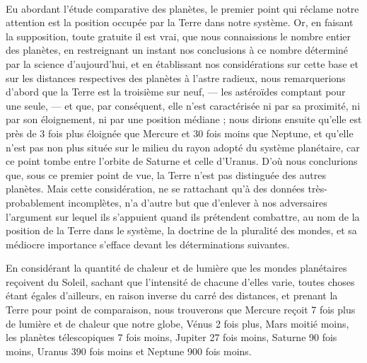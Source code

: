 \documentclass[a4paper, 11pt, oneside, landscape]{article}
\begin{document}
\paragraph{}
Eu abordant l'étude comparative des planètes, le premier point qui réclame notre attention est la position occupée par la Terre dans notre système. Or, en faisant la supposition, toute gratuite il est vrai, que nous connaissions le nombre entier des planètes, en restreignant un instant nos conclusions à ce nombre déterminé par la science d'aujourd'hui, et en établissant nos considérations sur cette base et sur les distances respectives des planètes à l'astre radieux, nous remarquerions d'abord que la Terre est la troisième sur neuf, --- les astéroïdes comptant pour une seule, --- et que, par conséquent, elle n'est caractérisée ni par sa proximité, ni par son éloignement, ni par une position médiane ; nous dirions ensuite qu'elle est près de 3 fois plus éloignée que Mercure et 30 fois moins que Neptune, et qu'elle n'est pas non plus située sur le milieu du rayon adopté du système planétaire, car ce point tombe entre l'orbite de Saturne et celle d'Uranus. D'où nous conclurions que, sous ce premier point de vue, la Terre n'est pas distinguée des autres planètes. Mais cette considération, ne se rattachant qu'à des données très-probablement incomplètes, n'a d'autre but que d'enlever à nos adversaires l'argument sur lequel ils s'appuient quand ils prétendent combattre, au nom de la position de la Terre dans le système, la doctrine de la pluralité des mondes, et sa médiocre importance s'efface devant les déterminations suivantes.

En considérant la quantité de chaleur et de lumière que les mondes planétaires reçoivent du Soleil, sachant que l'intensité de chacune d'elles varie, toutes choses étant égales d'ailleurs, en raison inverse du carré des distances, et prenant la Terre pour point de comparaison, nous trouverons que Mercure reçoit 7 fois plus de lumière et de chaleur que notre globe, Vénus 2 fois plus, Mars moitié moins, les planètes télescopiques 7 fois moins, Jupiter 27 fois moins, Saturne 90 fois moins, Uranus 390 fois moins et Neptune 900 fois moins.
\end{document}
